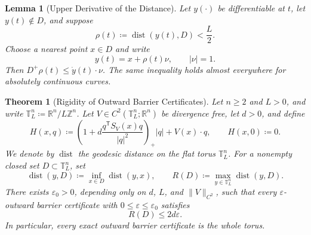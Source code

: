 \documentclass[10pt,a4paper]{amsart}
\newtheorem{theorem}{Theorem}
\newtheorem{lemma}{Lemma}
\newcommand{\T}{\mathbb T}
\newcommand{\dist}{\operatorname{dist}}
\begin{document}
\begin{lemma}[Upper Derivative of the Distance]\label{lem:distance-Dini-background}
Let $y(\cdot)$ be differentiable at $t$, let $y(t)\notin D$, and suppose
\[
  \rho(t)\coloneqq \dist(y(t),D)<\frac L2.
\]
Choose a nearest point $x\in D$ and write
\[
  y(t)=x+\rho(t)\nu,
  \qquad |\nu|=1.
\]
Then
  $D^+\rho(t)\le \dot y(t)\cdot\nu$.
The same inequality holds almost everywhere for absolutely continuous curves.
\end{lemma}

\begin{theorem}[Rigidity of Outward Barrier Certificates]
\label{thm:no barrier}
Let $n\ge2$ and $L>0$, and write
$\T_L^n\coloneqq\mathbb R^n/L\mathbb Z^n$.  Let
$V\in C^2(\T_L^n;\mathbb R^n)$ be divergence free, let $d>0$, and
define
\[
  H(x,q)
  \coloneqq
  \left(
    1+d\frac{q^{\mathsf T}S_V(x)q}{|q|^2}
  \right)_+|q|
  +V(x)\cdot q,
  \qquad H(x,0)\coloneqq0.
\]
We denote by $\dist$ the geodesic distance on the flat torus
$\T_L^n$. For a nonempty closed set $D\subset\T_L^n$, set
\[
  \dist(y,D)\coloneqq\inf_{x\in D}\dist(y,x),
  \qquad
  R(D)\coloneqq\max_{y\in\T_L^n}\dist(y,D).
\]
There exists $\varepsilon_0>0$, depending only on
$d$, $L$, and $\|V\|_{C^2}$, such that every
$\varepsilon$-outward barrier certificate with
$0\le\varepsilon\le\varepsilon_0$ satisfies
\[
  R(D)\le2d\varepsilon.
\]
In particular, every exact outward barrier certificate is the whole
torus.
\end{theorem}
\end{document}
